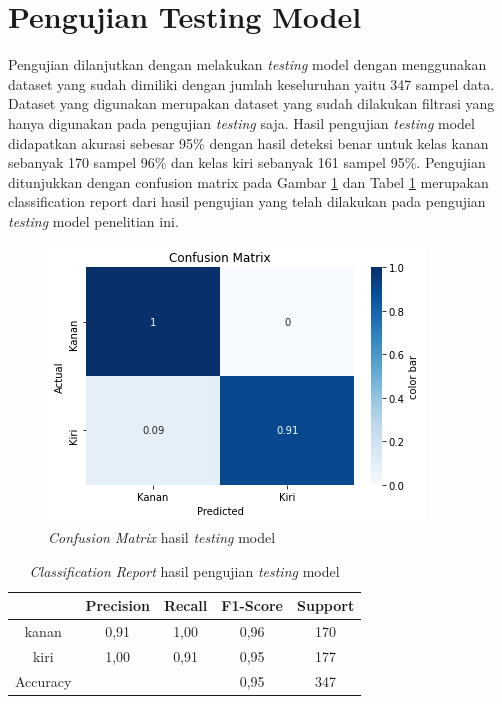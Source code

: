 \section{Pengujian Testing Model}
\label{sec:PengujianTestingModel}

Pengujian dilanjutkan dengan melakukan \emph{testing} model dengan menggunakan dataset yang sudah dimiliki dengan jumlah keseluruhan yaitu 347 sampel data. Dataset yang digunakan merupakan dataset yang sudah dilakukan filtrasi yang hanya digunakan pada pengujian \emph{testing} saja. Hasil pengujian \emph{testing} model didapatkan akurasi sebesar 95\% dengan hasil deteksi benar untuk kelas kanan sebanyak 170 sampel 96\% dan kelas kiri sebanyak 161 sampel 95\%. Pengujian ditunjukkan dengan confusion matrix pada Gambar \ref{fig:HasilTesting} dan Tabel \ref{tb:ClassificationReport} merupakan classification report dari hasil pengujian yang telah dilakukan pada pengujian \emph{testing} model penelitian ini.

\begin{figure}[H]
  \centering
  \includegraphics[scale=1]{gambar/cm normalized.png}
  \caption{\emph{Confusion Matrix} hasil \emph{testing} model}
  \label{fig:HasilTesting}
\end{figure}

\begin{longtable}{|c|c|c|c|c|}
  \caption{\emph{Classification Report} hasil pengujian \emph{testing} model}
  \label{tb:ClassificationReport}                                   \\
  \hline
  \rowcolor[HTML]{C0C0C0}
   & \textbf{Precision} & \textbf{Recall} & \textbf{F1-Score} & \textbf{Support} \\
  \hline
  kanan     & 0,91    & 1,00    & 0,96    & 170         \\
  \hline
  kiri      & 1,00    & 0,91    & 0,95    & 177           \\
  \hline
  Accuracy  &         &         & 0,95    & 347            \\
  \hline
\end{longtable}

